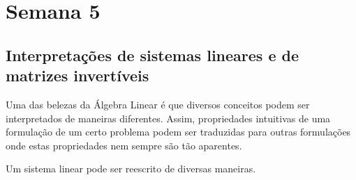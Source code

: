\documentclass[../livro.tex]{subfiles}  %
\begin{document}
\chapter{Semana 5}

\section{Interpretações de sistemas lineares e de matrizes invertíveis}

Uma das belezas da Álgebra Linear é que diversos conceitos podem ser interpretados de maneiras diferentes. Assim, propriedades intuitivas de uma formulação de um certo problema podem ser traduzidas para outras formulações onde estas propriedades nem sempre são tão aparentes.

Um sistema linear pode ser reescrito de diversas maneiras.
\end{document}
